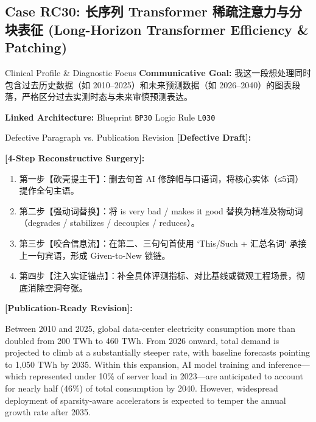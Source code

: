 \subsection{Case RC30: 长序列 Transformer 稀疏注意力与分块表征 (Long-Horizon Transformer Efficiency \& Patching)}\label{case:RC30}
\begin{ConceptBox}{Clinical Profile \& Diagnostic Focus}
\textbf{Communicative Goal:} 我这一段想处理同时包含过去历史数据（如 2010--2025）和未来预测数据（如 2026--2040）的图表段落，严格区分过去实测时态与未来审慎预测表达。\par
\textbf{Linked Architecture:} Blueprint \texttt{BP30} \enspace\textbar\enspace Logic Rule \texttt{L030}
\end{ConceptBox}
\begin{ExampleBox}{Defective Paragraph vs. Publication Revision}
\textbf{\color{TargetHighlight}[Defective Draft]:}\par
{}\par\vspace{6pt}
\textbf{\color{AcadForest}[4-Step Reconstructive Surgery]:}
\begin{enumerate}[label=\textbf{\color{AcadNavy}Step \arabic*:}, leftmargin=2em]
  \item 第一步【砍壳提主干】：删去句首 AI 修辞帽与口语词，将核心实体（≤5词）提作全句主语。
  \item 第二步【强动词替换】：将 is very bad / makes it good 替换为精准及物动词（degrades / stabilizes / decouples / reduces）。
  \item 第三步【咬合信息流】：在第二、三句句首使用 `This/Such + 汇总名词` 承接上一句宾语，形成 Given-to-New 锁链。
  \item 第四步【注入实证锚点】：补全具体评测指标、对比基线或微观工程场景，彻底消除空洞夸张。
\end{enumerate}\vspace{4pt}
\textbf{\color{AcadNavy}[Publication-Ready Revision]:}\par
Between 2010 and 2025, global data-center electricity consumption more than doubled from 200 TWh to 460 TWh. From 2026 onward, total demand is projected to climb at a substantially steeper rate, with baseline forecasts pointing to 1,050 TWh by 2035. Within this expansion, AI model training and inference---which represented under 10\% of server load in 2023---are anticipated to account for nearly half (46\%) of total consumption by 2040. However, widespread deployment of sparsity-aware accelerators is expected to temper the annual growth rate after 2035.
\end{ExampleBox}
